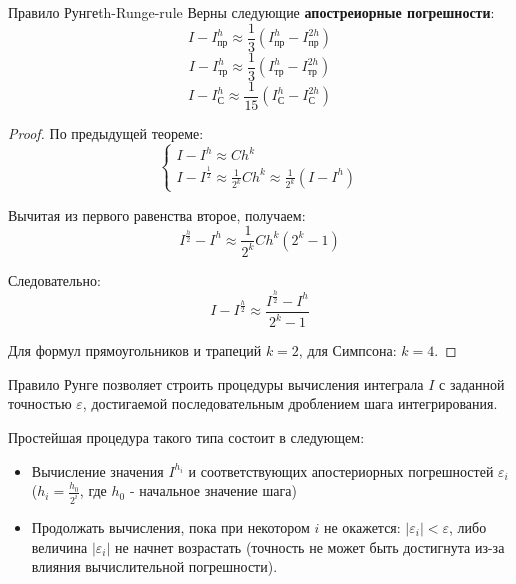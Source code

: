 \documentclass[14pt]{extarticle}
\begin{document}
    \begin{theorem}{Правило Рунге}{th-Runge-rule}
        Верны следующие \textbf{апостреиорные погрешности}:
        $$I - I_{\text{пр}}^{h} \approx \frac{1}{3}(I_{\text{пр}}^{h} - I_{\text{пр}}^{2h})$$
        $$I - I_{\text{тр}}^{h} \approx \frac{1}{3}(I_{\text{тр}}^{h} - I_{\text{тр}}^{2h})$$
        $$I - I_{\text{С}}^{h} \approx \frac{1}{15}(I_{\text{С}}^{h} - I_{\text{С}}^{2h})$$
   
        \begin{proof}
            По предыдущей теореме:
            $$
            \begin{cases}
                I - I^{h} \approx Ch^{k}\\
                I - I^{\frac{1}{2}} \approx \frac{1}{2^{k}}Ch^{k} \approx \frac{1}{2^{k}}(I - I^{h})
            \end{cases}
            $$

            Вычитая из первого равенства второе, получаем:
            $$I^{\frac{h}{2}} - I^{h} \approx \frac{1}{2^{k}} Ch^{k}(2^{k} - 1)$$

            Следовательно:
            $$I - I^{\frac{h}{2}} \approx \frac{I^{\frac{h}{2}} - I^{h}}{2^{k} - 1}$$
        
            Для формул прямоугольников и трапеций $k = 2$, для Симпсона: $k = 4$.
        \end{proof}
    \end{theorem}

    Правило Рунге позволяет строить процедуры вычисления интеграла $I$ с заданной точностью $\varepsilon$, достигаемой последовательным дроблением шага интегрирования.

    \vspace{\baselineskip}

    Простейшая процедура такого типа состоит в следующем:
    \begin{itemize}
        \item Вычисление значения $I^{h_{i}}$ и соответствующих апостериорных погрешностей $\varepsilon_{i}$ ($h_{i} = \frac{h_{0}}{2^{i}}$, где $h_{0}$ - начальное значение шага)
        \item Продолжать вычисления, пока при некотором $i$ не окажется: $|\varepsilon_{i}| < \varepsilon$, либо величина $|\varepsilon_{i}|$ не начнет возрастать (точность не может быть достигнута из-за влияния вычислительной погрешности).
    \end{itemize}
\end{document}
